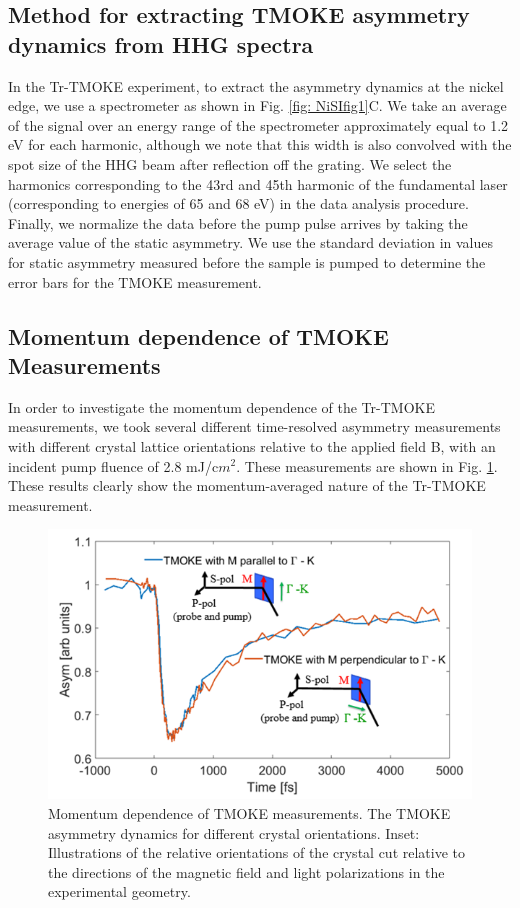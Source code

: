 \subsection{Method for extracting TMOKE asymmetry dynamics from HHG spectra}
In the Tr-TMOKE experiment, to extract the asymmetry dynamics at the nickel edge, we use a spectrometer as shown in Fig. \ref{fig: NiSIfig1}C. We take an average of the signal over an energy range of the spectrometer approximately equal to 1.2 eV for each harmonic, although we note that this width is also convolved with the spot size of the HHG beam after reflection off the grating. We select the harmonics corresponding to the 43rd and 45th harmonic of the fundamental laser (corresponding to energies of 65 and 68 eV) in the data analysis procedure. Finally, we normalize the data before the pump pulse arrives by taking the average value of the static asymmetry. We use the standard deviation in values for static asymmetry measured before the sample is pumped to determine the error bars for the TMOKE measurement.

\subsection{Momentum dependence of TMOKE Measurements}
In order to investigate the momentum dependence of the Tr-TMOKE measurements, we took several different time-resolved asymmetry measurements with different crystal lattice orientations relative to the applied field B, with an incident pump fluence of 2.8 mJ/c$m^2$. These measurements are shown in Fig. \ref{fig: NiSIfig7}. These results clearly show the momentum-averaged nature of the Tr-TMOKE measurement.

\begin{figure}[htbp]
	\begin{center}
		\includegraphics[width=150mm]{figs/NiFigS7}
	\end{center}
	\caption{Momentum dependence of TMOKE measurements. The TMOKE asymmetry dynamics for different crystal orientations. Inset:  Illustrations of the relative orientations of the crystal cut relative to the directions of the magnetic field and light polarizations in the experimental geometry.}
	\label{fig: NiSIfig7}
\end{figure}


